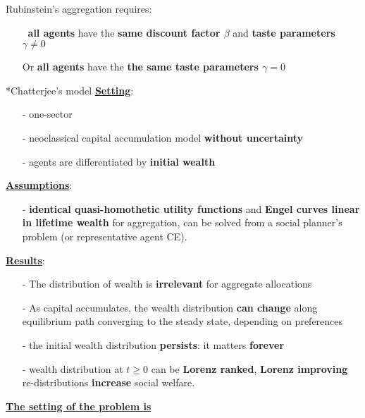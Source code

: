 \documentclass[10pt,landscape,a4paper]{article}
\makeatletter
\renewcommand{\subsection}{\@startsection{subsection}{1}{0mm}{.2ex}{.2ex}{\small\bfseries}}
\makeatother
\begin{document}
\begin{multicols*}{3}
Rubinstein's aggregation requires:
\begin{itemize}
    \item[$\ $] \textbf{all agents} have the \textbf{\color{myred}same discount factor $\beta$} and \textbf{\color{myred}taste parameters $\gamma\neq 0$} 
    \item[Or] \textbf{all agents} have the \textbf{\color{myred}the same taste parameters $\gamma=0$} 
\end{itemize}

\subsection*{Chatterjee's model}
\underline{\textbf{Setting}}:
\begin{itemize}
    \item[-] one-sector
    \item[-] neoclassical capital accumulation model \textbf{without uncertainty}
    \item[-] agents are differentiated by \textbf{\color{myred}initial wealth}
\end{itemize}
\underline{\textbf{Assumptions}}:
\begin{itemize}
    \item[-] \textbf{identical {\color{myred}quasi-homothetic} utility functions} and \textbf{Engel curves {\color{myred}linear} in lifetime wealth} for aggregation, can be solved from a social planner's problem (or representative agent CE).
\end{itemize}
\underline{\textbf{Results}}:
\begin{itemize}
    \item[-] The distribution of wealth is \textbf{\color{myred}irrelevant} for aggregate allocations
    \item[-] As capital accumulates, the wealth distribution \textbf{\color{myred}can change} along equilibrium path converging to the steady state, depending on preferences
    \item[-] the initial wealth distribution \textbf{\color{myred}persists}: it matters \textbf{forever}
    \item[-] wealth distribution at $t\geq 0$ can be \textbf{\color{myred}Lorenz ranked}, \textbf{\color{myred}Lorenz improving} re-distributions \textbf{increase} social welfare.
\end{itemize}

\vspace{2pt}
\underline{\textbf{The setting of the problem is}}


\end{multicols*}
\end{document}
